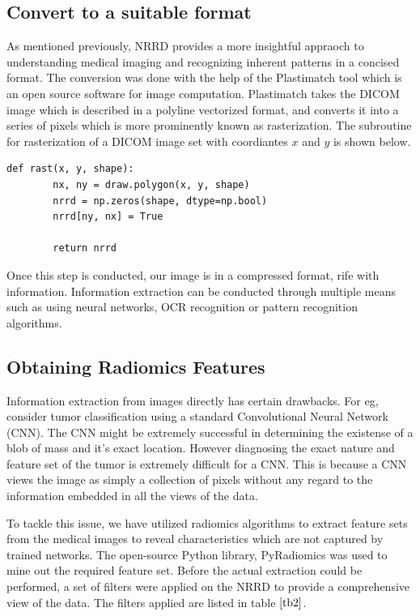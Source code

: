 \documentclass[final,1p,times,twocolumn]{elsarticle}
\begin{document}
\subsection{Convert to a suitable format}

As mentioned previously, NRRD provides a more insightful appraoch to understanding medical imaging and recognizing inherent patterns in a concised format. The conversion was done with the help of the Plastimatch tool which is an open source software for image computation. Plastimatch takes the DICOM image which is described in a polyline vectorized format, and converts it into a series of pixels which is more prominently known as rasterization. The subroutine for rasterization of a DICOM image set with coordiantes $x$ and $y$ is shown below.

\begin{verbatim}
def rast(x, y, shape):
        nx, ny = draw.polygon(x, y, shape)
        nrrd = np.zeros(shape, dtype=np.bool)
        nrrd[ny, nx] = True 

        return nrrd
\end{verbatim}

Once this step is conducted, our image is in a compressed format, rife with information. Information extraction can be conducted through multiple means such as using neural networks, OCR recognition or pattern recognition algorithms. 

\subsection{Obtaining Radiomics Features}

Information extraction from images directly has certain drawbacks. For eg, consider tumor classification using a standard Convolutional Neural Network (CNN). The CNN might be extremely successful in determining the existense of a blob of mass and it's exact location. However diagnosing the exact nature and feature set of the tumor is extremely difficult for a CNN. This is because a CNN views the image as simply a collection of pixels without any regard to the information embedded in all the views of the data. 

To tackle this issue, we have utilized radiomics algorithms to extract feature sets from the medical images to reveal characteristics which are not captured by trained networks. The open-source Python library, PyRadiomics was used to mine out the required feature set. Before the actual extraction could be performed, a set of filters were applied on the NRRD to provide a comprehensive view of the data. The filters applied are listed in table $\ref{tb2}$. 
\end{document}
